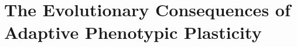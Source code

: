 \chapter{The Evolutionary Consequences of Adaptive Phenotypic Plasticity}
\label{chapter:evolutionary-consequences-of-plasticity}